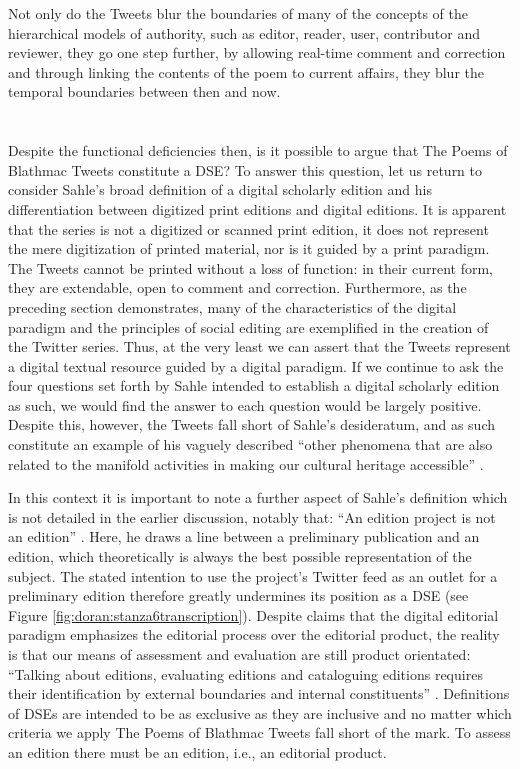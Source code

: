 \begin{paper}
Not only do the Tweets blur the boundaries of many of the concepts of the hierarchical models of authority, such as editor, reader, user, contributor and reviewer, they go one step further, by allowing real-time comment and correction and through linking the contents of the poem to current affairs, they blur the temporal boundaries between then and now.  


\section*{}
Despite the functional deficiencies then, is it possible to argue that The Poems of Blathmac Tweets constitute a DSE? To answer this question, let us return to consider Sahle’s broad definition of a digital scholarly edition and his differentiation between digitized print editions and digital editions. It is apparent that the series is not a digitized or scanned print edition, it does not represent the mere digitization of printed material, nor is it guided by a print paradigm. The Tweets cannot be printed without a loss of function: in their current form, they are extendable, open to comment and correction.  Furthermore, as the preceding section demonstrates, many of the characteristics of the digital paradigm and the principles of social editing are exemplified in the creation of the Twitter series. Thus, at the very least we can assert that the Tweets represent a digital textual resource guided by a digital paradigm. If we continue to ask the four questions set forth by Sahle intended to establish a digital scholarly edition as such, we would find the answer to each question would be largely positive. Despite this, however, the Tweets fall short of Sahle’s desideratum, and as such constitute an example of his vaguely described ``other phenomena that are also related to the manifold activities in making our cultural heritage accessible'' \citep[38]{sahle_scholarly_2016}.

In this context it is important to note a further aspect of Sahle’s definition which is not detailed in the earlier discussion, notably that: ``An edition project is not an edition'' \citep[35]{sahle_scholarly_2016}. Here, he draws a line between a preliminary publication and an edition, which theoretically is always the best possible representation of the subject. The stated intention to use the project’s Twitter feed as an outlet for a preliminary edition therefore greatly undermines its position as a DSE (see Figure \ref{fig:doran:stanza6transcription}). Despite claims that the digital editorial paradigm emphasizes the editorial process over the editorial product, the reality is that our means of assessment and evaluation are still product orientated: ``Talking about editions, evaluating editions and cataloguing editions requires their identification by external boundaries and internal constituents'' \citep[36]{sahle_scholarly_2016}. Definitions of DSEs are intended to be as exclusive as they are inclusive and no matter which criteria we apply The Poems of Blathmac Tweets fall short of the mark. To assess an edition there must be an edition, i.e., an editorial product. 


\end{paper}

